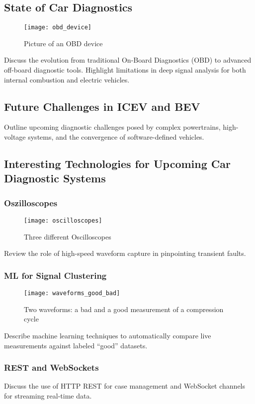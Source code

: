 \subsection{State of Car Diagnostics}
\begin{figure}[ht]
  \centering
  \texttt{[image: obd\_device]}
  \caption{Picture of an OBD device}
  \label{fig:obd}
\end{figure}
Discuss the evolution from traditional On-Board Diagnostics (OBD) to advanced off-board diagnostic tools. Highlight limitations in deep signal analysis for both internal combustion and electric vehicles.

\subsection{Future Challenges in ICEV and BEV}
Outline upcoming diagnostic challenges posed by complex powertrains, high-voltage systems, and the convergence of software-defined vehicles.

\subsection{Interesting Technologies for Upcoming Car Diagnostic Systems}
\subsubsection{Oszilloscopes}
\begin{figure}[ht]
  \centering
  \texttt{[image: oscilloscopes]}
  \caption{Three different Oscilloscopes}
  \label{fig:scopes}
\end{figure}
Review the role of high-speed waveform capture in pinpointing transient faults.

\subsubsection{ML for Signal Clustering}
\begin{figure}[ht]
  \centering
  \texttt{[image: waveforms\_good\_bad]}
  \caption{Two waveforms: a bad and a good measurement of a compression cycle}
  \label{fig:waveforms_good_bad}
\end{figure}
Describe machine learning techniques to automatically compare live measurements against labeled “good” datasets.

\subsubsection{REST and WebSockets}
Discuss the use of HTTP REST for case management and WebSocket channels for streaming real-time data.

